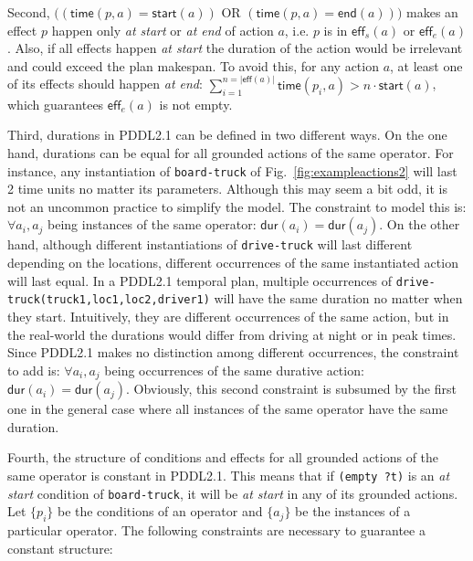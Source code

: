 \documentclass{ecai}
\newcommand{\eff}{\mathsf{eff}}    %
\newcommand{\dur}{\mathsf{dur}}    %
\newcommand{\start}{\mathsf{start}}%
\newcommand{\en}{\mathsf{end}}     %
\newcommand{\tim}{\mathsf{time}}   %
\begin{document}
Second, $((\tim(p,a) = \start(a))$ OR $(\tim(p,a) = \en(a)))$ makes an effect $p$ happen only \emph{at start} or \emph{at end} of action $a$, i.e. $p$ is in $\eff_s(a)$ or $\eff_e(a)$.
Also, if all effects happen \emph{at start} the duration of the action would be irrelevant and could exceed the plan makespan. To avoid this, for any action $a$, at least one of its effects should happen \emph{at end}: $\sum_{i=1}^{n =|\eff(a)|} \tim(p_i,a) > n \cdot \start(a)$, which guarantees $\eff_e(a)$ is not empty.



Third, durations in PDDL2.1 can be defined in two different ways. On the one hand, durations can be equal for all grounded actions of the same operator. For instance, any instantiation of \texttt{board-truck} of Fig.~\ref{fig:exampleactions2} will last 2 time units no matter its parameters. Although this may seem a bit odd, it is not an uncommon practice to simplify the model. The constraint to model this is: $\forall a_i,a_j$ being instances of the same operator: $\dur(a_i) = \dur(a_j)$.
On the other hand, although different instantiations of \texttt{drive-truck} will last different depending on the locations, different occurrences of the same instantiated action will last equal.
In a PDDL2.1 temporal plan, multiple occurrences of \texttt{drive-truck(truck1,loc1,loc2,driver1)} will have the same duration no matter when they start. Intuitively, they are different occurrences of the same action, but in the real-world the durations would differ from driving at night or in peak times. Since PDDL2.1 makes no distinction among different occurrences, the constraint to add is: $\forall a_i,a_j$ being occurrences of the same durative action: $\dur(a_i) = \dur(a_j)$.
Obviously, this second constraint is subsumed by the first one in the general case where all instances of the same operator have the same duration.

Fourth, the structure of conditions and effects for all grounded actions of the same operator is constant in PDDL2.1. This means that if \texttt{(empty ?t)} is an \emph{at start} condition of \texttt{board-truck}, it will be \emph{at start} in any of its grounded actions.
Let $\{p_i\}$ be the conditions of an operator and $\{a_j\}$ be the instances of a particular operator. The following constraints are necessary to guarantee a constant structure:
\end{document}
